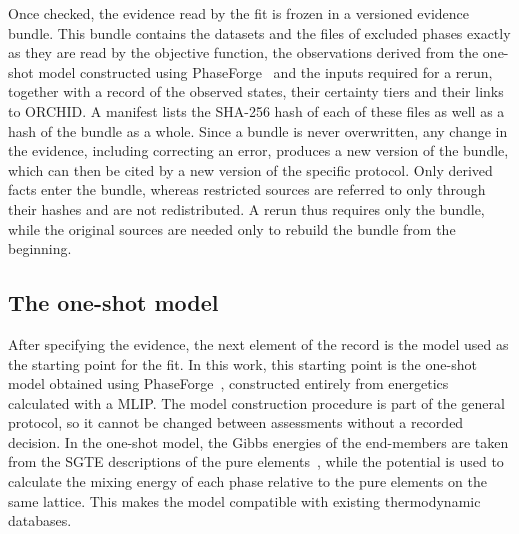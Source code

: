 Once checked, the evidence read by the fit is frozen in a versioned evidence bundle. This bundle contains the datasets and the files of excluded phases exactly as they are read by the objective function, the observations derived from the one-shot model constructed using PhaseForge~\cite{zhu2025accelerating} and the inputs required for a rerun, together with a record of the observed states, their certainty tiers and their links to ORCHID. A manifest lists the SHA-256 hash of each of these files as well as a hash of the bundle as a whole. Since a bundle is never overwritten, any change in the evidence, including correcting an error, produces a new version of the bundle, which can then be cited by a new version of the specific protocol. Only derived facts enter the bundle, whereas restricted sources are referred to only through their hashes and are not redistributed. A rerun thus requires only the bundle, while the original sources are needed only to rebuild the bundle from the beginning.

\subsection{The one-shot model}
\label{sec:methods:phaseforge}

After specifying the evidence, the next element of the record is the model used as the starting point for the fit. In this work, this starting point is the one-shot model obtained using PhaseForge~\cite{zhu2025accelerating,zhu2025machinelearningpotentialsalloys}, constructed entirely from energetics calculated with a MLIP. The model construction procedure is part of the general protocol, so it cannot be changed between assessments without a recorded decision. In the one-shot model, the Gibbs energies of the end-members are taken from the SGTE descriptions of the pure elements~\cite{dinsdale1991sgte}, while the potential is used to calculate the mixing energy of each phase relative to the pure elements on the same lattice. This makes the model compatible with existing thermodynamic databases.

